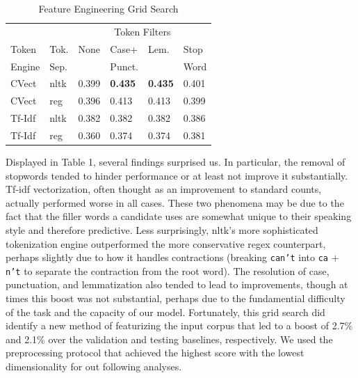 \documentclass[11pt,a4paper]{article}
\begin{document}
\FloatBarrier
\begin{table}[h]
    \centering
    \caption{Feature Engineering Grid Search}
    \begin{tabular}{
    	l
        l
        l
        l
        l
        l
        }
        \toprule
        \multicolumn{2}{c}{} &
        \multicolumn{4}{c}{Token Filters}\\
        \cmidrule(lr){3-6} 
        {Token}& {Tok.} &{None} &{Case+}&{Lem.}& {Stop}\\
        {Engine} & {Sep.} && {Punct.}&&{Word}\\
        \midrule
      CVect & nltk & 0.399& \textbf{0.435}& \textbf{0.435}& 0.401\\
        CVect & reg& 0.396& 0.413&0.413& 0.399\\
        Tf-Idf & nltk & 0.382&  0.382 &0.382 & 0.386\\
        Tf-Idf & reg & 0.360& 0.374 & 0.374& 0.381\\
        \bottomrule
    \end{tabular}
\end{table}
\FloatBarrier

Displayed in Table 1, several findings surprised us. In particular, the removal of stopwords tended to hinder performance or at least not improve it substantially. Tf-idf vectorization, often thought as an improvement to standard counts, actually performed worse in all cases. These two phenomena may be due to the fact that the filler words a candidate uses are somewhat unique to their speaking style and therefore predictive. Less surprisingly, nltk's more sophisticated tokenization engine outperformed the more conservative regex counterpart, perhaps slightly due to how it handles contractions (breaking \texttt{can't} into \texttt{ca} + \texttt{n't} to separate the contraction from the root word). The resolution of case, punctuation, and lemmatization also tended to lead to improvements, though at times this boost was not substantial, perhaps due to the fundamential difficulty of the task and the capacity of our model. Fortunately, this grid search did identify a new method of featurizing the input corpus that led to a boost of 2.7\% and 2.1\% over the validation and testing baselines, respectively. We used the preprocessing protocol that achieved the highest score with the lowest dimensionality for out following analyses.
\end{document}
